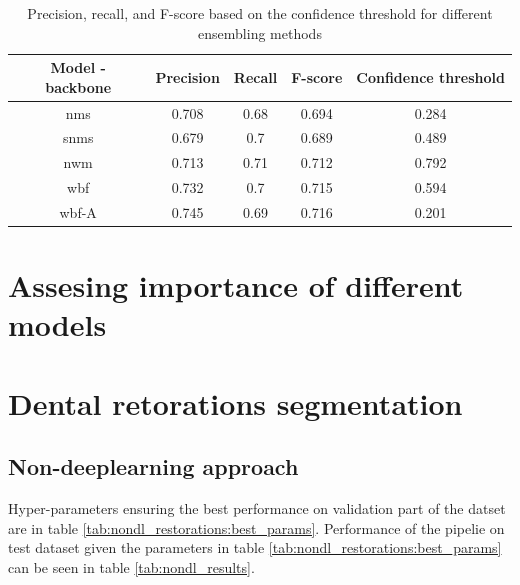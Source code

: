 \begin{table}[h]
    \begin{tabular}{|c|c|c|c|c|}
        \hline
        Model - backbone & Precision & Recall & F-score & Confidence threshold \\ \hline
        nms              & 0.708     & 0.68   & 0.694   & 0.284                \\ \hline
        snms             & 0.679     & 0.7    & 0.689   & 0.489                \\ \hline
        nwm              & 0.713     & 0.71   & 0.712   & 0.792                \\ \hline
        wbf              & 0.732     & 0.7    & 0.715   & 0.594                \\ \hline
        wbf-A            & 0.745     & 0.69   & 0.716   & 0.201                \\ \hline
    \end{tabular}
    \caption{Precision, recall, and F-score based on the confidence threshold for different ensembling methods}
    \label{tab:ensembling_prf:grid_search}
\end{table}

\section{Assesing importance of different models}


\section{Dental retorations segmentation}
\subsection{Non-deeplearning approach}
Hyper-parameters ensuring the best performance on validation part of the datset are in table \ref{tab:nondl_restorations:best_params}. Performance of the pipelie on test dataset given the parameters in table \ref{tab:nondl_restorations:best_params} can be seen in table \ref{tab:nondl_results}.

